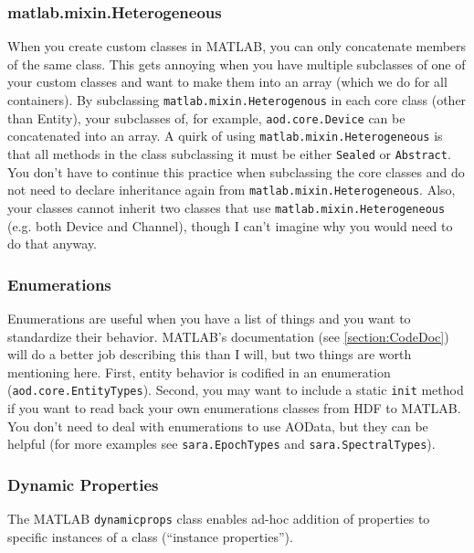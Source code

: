 \documentclass[10pt]{exam}
\newcommand\myurl[1]{\textcolor{blue}{\underline{#1}}}
\newcommand\aodclass[1]{\textcolor{codeblue}{\texttt{#1}}}
\newcommand\matclass[1]{\textcolor{codeblue}{\texttt{#1}}}
\newcommand\aodfcn[1]{\textcolor{darkteal}{\texttt{#1}}}
\begin{document}
	\subsubsection{matlab.mixin.Heterogeneous}\label{subsubsection:Heterogeneous}
		\noindent When you create custom classes in MATLAB, you can only concatenate members of the same class. This gets annoying when you have multiple subclasses of one of your custom classes and want to make them into an array (which we do for all containers). By subclassing \matclass{matlab.mixin.Heterogenous} in each core class (other than Entity), your subclasses of, for example, \aodclass{aod.core.Device} can be concatenated into an array. A quirk of using \matclass{matlab.mixin.Heterogeneous} is that all methods in the class subclassing it must be either \texttt{Sealed} or \texttt{Abstract}. You don't have to continue this practice when subclassing the core classes and do not need to declare inheritance again from \matclass{matlab.mixin.Heterogeneous}. Also, your classes cannot inherit two classes that use \matclass{matlab.mixin.Heterogeneous} (e.g. both Device and Channel), though I can't imagine why you would need to do that anyway.
	\subsubsection{Enumerations}\label{subsubsection:Enum}
		\noindent Enumerations are useful when you have a list of things and you want to standardize their behavior. MATLAB's documentation (see \myurl{\ref{section:CodeDoc}}) will do a better job describing this than I will, but two things are worth mentioning here. First, entity behavior is codified in an enumeration (\aodclass{aod.core.EntityTypes}). Second, you may want to include a static \aodfcn{init} method if you want to read back your own enumerations classes from HDF to MATLAB. You don't need to deal with enumerations to use AOData, but they can be helpful (for more examples see \aodclass{sara.EpochTypes} and \aodclass{sara.SpectralTypes}).	
	\subsubsection{Dynamic Properties}
		\label{subsubsection:DynProps}
		\noindent The MATLAB \aodclass{dynamicprops} class enables ad-hoc addition of properties to specific instances of a class (``instance properties''). 
\end{document}
